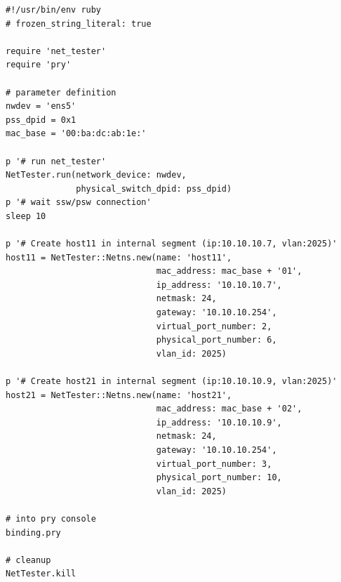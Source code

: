 \begin{lstlisting}[caption=NetTester基礎,label=lst:nettester_basic_example]
#!/usr/bin/env ruby
# frozen_string_literal: true

require 'net_tester'
require 'pry'

# parameter definition
nwdev = 'ens5'
pss_dpid = 0x1
mac_base = '00:ba:dc:ab:1e:'

p '# run net_tester'
NetTester.run(network_device: nwdev,
              physical_switch_dpid: pss_dpid)
p '# wait ssw/psw connection'
sleep 10

p '# Create host11 in internal segment (ip:10.10.10.7, vlan:2025)'
host11 = NetTester::Netns.new(name: 'host11',
                              mac_address: mac_base + '01',
                              ip_address: '10.10.10.7',
                              netmask: 24,
                              gateway: '10.10.10.254',
                              virtual_port_number: 2,
                              physical_port_number: 6,
                              vlan_id: 2025)

p '# Create host21 in internal segment (ip:10.10.10.9, vlan:2025)'
host21 = NetTester::Netns.new(name: 'host21',
                              mac_address: mac_base + '02',
                              ip_address: '10.10.10.9',
                              netmask: 24,
                              gateway: '10.10.10.254',
                              virtual_port_number: 3,
                              physical_port_number: 10,
                              vlan_id: 2025)

# into pry console
binding.pry

# cleanup
NetTester.kill
\end{lstlisting}

